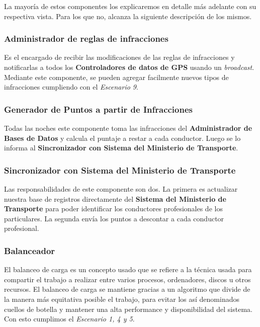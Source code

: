 La mayoría de estos componentes los explicaremos en detalle más adelante con su 
respectiva vista. Para los que no, alcanza la siguiente descripción de los 
mismos.


\subsubsection{Administrador de reglas de infracciones}

Es el encargado de recibir las modificaciones de las reglas de infracciones y 
notificarlas a todos los \textbf{Controladores de datos de GPS} usando un \textit{broadcast}.
Mediante este componente, se pueden agregar facilmente nuevos tipos de 
infracciones cumpliendo con el \textit{Escenario 9}.

\subsubsection{Generador de Puntos a partir de Infracciones}

Todas las noches este componente toma las infracciones del \textbf{Administrador de Bases de Datos} 
y calcula el puntaje a restar a cada conductor. Luego se lo informa al
\textbf{Sincronizador con Sistema del Ministerio de Transporte}.

\subsubsection{Sincronizador con Sistema del Ministerio de Transporte}

Las responsabilidades de este componente son dos.
La primera es actualizar nuestra base de registros directamente del \textbf{Sistema del Ministerio de Transporte}
para poder identificar los conductores profesionales de los particulares. 
La segunda envía los puntos a descontar a cada conductor profesional.

\subsubsection{Balanceador}
El balanceo de carga es un concepto usado que se refiere a la técnica usada para compartir el trabajo
a realizar entre varios procesos, ordenadores, discos u otros recursos.
El balanceo de carga se mantiene gracias a un algoritmo que divide de la manera más equitativa posible
el trabajo, para evitar los así denominados cuellos de botella y mantener una 
alta performance y disponibilidad del sistema. Con esto cumplimos el \textit{Escenario 
1, 4 y 5}.


